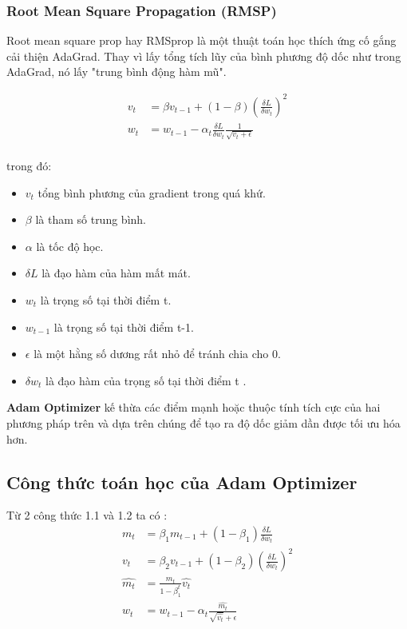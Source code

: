 \subsubsection*{Root Mean Square Propagation (RMSP)}
Root mean square prop hay RMSprop là một thuật toán học thích ứng cố gắng cải thiện AdaGrad. Thay vì lấy tổng tích lũy của bình phương độ dốc như trong AdaGrad, 
nó lấy "trung bình động hàm mũ".

\begin{equation}
\begin{aligned}
v_t & = \beta v_{t-1} + (1 - \beta) (\frac{\delta L}{\delta w_t})^2 \\
w_t & = w_{t-1} - \alpha_t \frac{\delta L}{\delta w_t} \frac{1}{\sqrt{v_t + \epsilon}}\\
\end{aligned}
\end{equation}

trong đó:

\begin{itemize}
\item $v_t$ tổng bình phương của gradient trong quá khứ.
\item $\beta$ là tham số trung bình.
\item $\alpha$ là tốc độ học.
\item $\delta L$ là đạo hàm của hàm mất mát.
\item $w_t$ là trọng số tại thời điểm t.
\item $w_{t-1}$ là trọng số tại thời điểm t-1.
\item $\epsilon$ là một hằng số dương rất nhỏ để tránh chia cho 0.
\item $\delta w_t$ là đạo hàm của trọng số tại thời điểm t .

\end{itemize}

\textbf{Adam Optimizer} kế thừa các điểm mạnh hoặc thuộc tính tích cực của hai phương pháp trên và dựa trên chúng để tạo ra độ dốc giảm dần được tối ưu hóa hơn.

\subsection*{Công thức toán học của Adam Optimizer}
Từ 2 công thức 1.1 và 1.2 ta có :
\begin{equation}
\begin{aligned}
m_t & = \beta_1 m_{t-1} + (1 - \beta_1) \frac{\delta L}{\delta w_t} \\
v_t & = \beta_2 v_{t-1} + (1 - \beta_2) (\frac{\delta L}{\delta w_t})^2 \\
\hat{m_t} & = \frac{m_t}{1 - \beta_1^t} \hat{v_t} \\
w_t & = w_{t-1} - \alpha_t \frac{\hat{m_t}}{\sqrt{\hat{v_t}} + \epsilon}\\
\end{aligned}
\end{equation}

